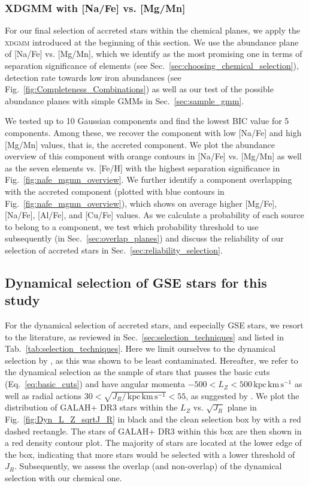 \documentclass[fleqn,usenatbib]{mnras}
\newcommand{\kpckms}{\,\mathrm{kpc\,km\,s^{-1}}}	%
\begin{document}
\subsubsection{XDGMM with [Na/Fe] vs. [Mg/Mn]} \label{sec:xdgmm_MgMn_Na} \label{sec:xdgmm_selection}

For our final selection of accreted stars within the chemical planes, we apply the \textsc{xdgmm} introduced at the beginning of this section. We use the abundance plane of [Na/Fe] vs. [Mg/Mn], which we identify as the most promising one in terms of separation significance of elements (see Sec.~\ref{sec:choosing_chemical_selection}), detection rate towards low iron abundances (see Fig.~\ref{fig:Completeness_Combinations}) as well as our test of the possible abundance planes with simple GMMs in Sec.~\ref{sec:sample_gmm}.

We tested up to 10 Gaussian components and find the lowest BIC value for 5 components. Among these, we recover the component with low [Na/Fe] and high [Mg/Mn] values, that is, the accreted component. We plot the abundance overview of this component with orange contours in [Na/Fe] vs. [Mg/Mn] as well as the seven elements vs. [Fe/H] with the highest separation significance in Fig.~\ref{fig:nafe_mgmn_overview}. We further identify a component overlapping with the accreted component (plotted with blue contours in Fig.~\ref{fig:nafe_mgmn_overview}), which shows on average higher [Mg/Fe], [Na/Fe], [Al/Fe], and [Cu/Fe] values. As we calculate a probability of each source to belong to a component, we test which probability threshold to use subsequently (in Sec.~\ref{sec:overlap_planes}) and discuss the reliability of our selection of accreted stars in Sec.~\ref{sec:reliability_selection}.

\subsection{Dynamical selection of GSE stars for this study} \label{sec:dynamical_selection}

For the dynamical selection of accreted stars, and especially GSE stars, we resort to the literature, as reviewed in Sec.~\ref{sec:selection_techniques} and listed in Tab.~\ref{tab:selection_techniques}. Here we limit ourselves to the dynamical selection by \citet{Feuillet2021}, as this was shown to be least contaminated. Hereafter, we refer to the dynamical selection as the sample of stars that passes the basic cuts (Eq.~\ref{eq:basic_cuts}) and have angular momenta $-500 < L_Z < 500 \kpckms$ as well as radial actions $30 < \sqrt{J_R / \kpckms} < 55$, as suggested by \citet{Feuillet2021}. We plot the distribution of GALAH+ DR3 stars within the $L_Z$ vs. $\sqrt{J_R}$ plane in Fig.~\ref{fig:Dyn_L_Z_sqrtJ_R} in black and the clean selection box by \citet{Feuillet2021} with a red dashed rectangle. The stars of GALAH+ DR3 within this box are then shown in a red density contour plot. The majority of stars are located at the lower edge of the box, indicating that more stars would be selected with a lower threshold of $J_R$. Subsequently, we assess the overlap (and non-overlap) of the dynamical selection with our chemical one.
\end{document}
